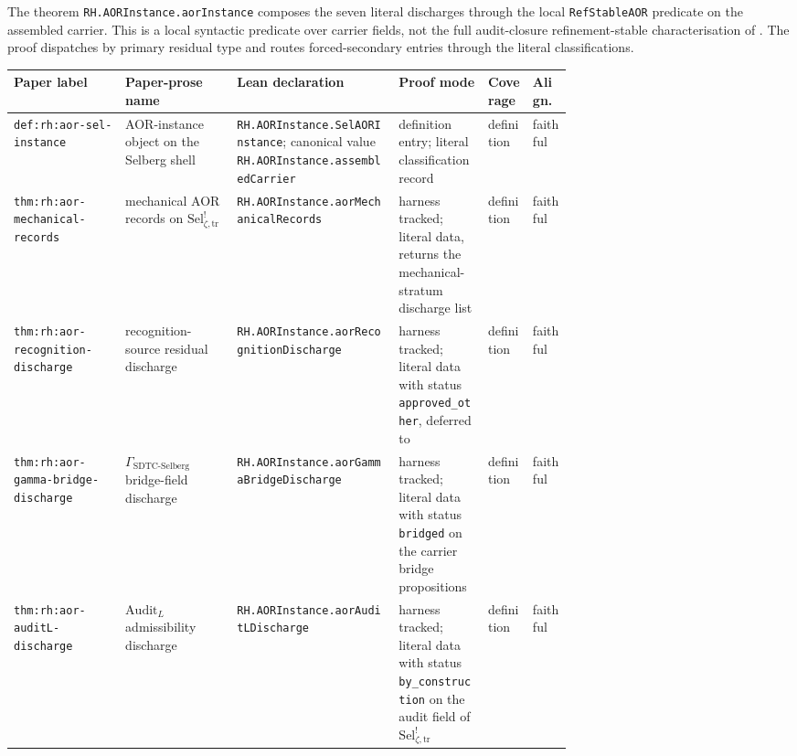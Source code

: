 \documentclass[11pt]{article}
\newcommand{\Sel}{\mathrm{Sel}^{!}_{\zeta,\mathrm{tr}}}
\newcommand{\GamSDTCSelberg}{\Gamma_{\mathrm{SDTC\text{-}Selberg}}}
\theoremstyle{definition}
\begin{document}
The theorem \nolinkurl{RH.AORInstance.aorInstance} composes the seven
literal discharges through the local \texttt{RefStableAOR} predicate on
the assembled carrier.  This is a local syntactic predicate over carrier
fields, not the full audit-closure refinement-stable characterisation of
\citet{TsiokosAOR2026}.  The proof dispatches by primary residual type
and routes forced-secondary entries through the literal classifications.

\begin{landscape}
\begin{table}[!ht]
\centering
\scriptsize
\setlength{\tabcolsep}{3pt}
\renewcommand{\arraystretch}{0.84}
\begin{tabularx}{\linewidth}{@{}
  >{\raggedright\arraybackslash}p{0.20\linewidth}
  >{\raggedright\arraybackslash}p{0.20\linewidth}
  >{\raggedright\arraybackslash}X
  >{\raggedright\arraybackslash}p{0.16\linewidth}
  >{\raggedright\arraybackslash}p{0.08\linewidth}
  >{\raggedright\arraybackslash}p{0.07\linewidth}@{}}
\toprule
Paper label & Paper-prose name & Lean declaration &
Proof mode & Coverage & Align. \\
\midrule
\nolinkurl{def:rh:aor-sel-instance} &
AOR-instance object on the Selberg shell &
\nolinkurl{RH.AORInstance.SelAORInstance};
canonical value \nolinkurl{RH.AORInstance.assembledCarrier} &
definition entry; literal classification record &
definition &
faithful \\

\nolinkurl{thm:rh:aor-mechanical-records} &
mechanical AOR records on \(\Sel\) &
\nolinkurl{RH.AORInstance.aorMechanicalRecords} &
harness tracked; literal data, returns the mechanical-stratum
discharge list &
definition &
faithful \\

\nolinkurl{thm:rh:aor-recognition-discharge} &
recognition-source residual discharge &
\nolinkurl{RH.AORInstance.aorRecognitionDischarge} &
harness tracked; literal data with status
\texttt{approved\_other}, deferred to \cite{TsiokosSDTC2026} &
definition &
faithful \\

\nolinkurl{thm:rh:aor-gamma-bridge-discharge} &
\(\GamSDTCSelberg\) bridge-field discharge &
\nolinkurl{RH.AORInstance.aorGammaBridgeDischarge} &
harness tracked; literal data with status \texttt{bridged} on the
carrier bridge propositions &
definition &
faithful \\

\nolinkurl{thm:rh:aor-auditL-discharge} &
\(\mathrm{Audit}_L\) admissibility discharge &
\nolinkurl{RH.AORInstance.aorAuditLDischarge} &
harness tracked; literal data with status \texttt{by\_construction}
on the audit field of \(\Sel\) &
definition &
faithful \\


\end{tabularx}
\end{table}
\end{landscape}
\end{document}
